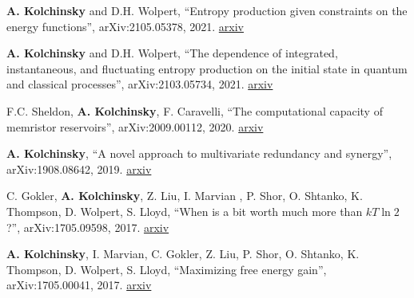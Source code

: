 
\textbf{A. Kolchinsky} and D.H. Wolpert, ``Entropy production given constraints on the energy functions'', arXiv:2105.05378, 2021. \href{http://arxiv.org/abs/2105.05378}{arxiv}


\textbf{A. Kolchinsky} and D.H. Wolpert, ``The dependence of integrated, instantaneous, and fluctuating entropy production on the initial state in quantum and classical processes'', arXiv:2103.05734, 2021. \href{http://arxiv.org/abs/2103.05734}{arxiv}


F.C. Sheldon, \textbf{A. Kolchinsky}, F. Caravelli, ``The computational capacity of memristor reservoirs'', arXiv:2009.00112, 2020. \href{http://arxiv.org/abs/2009.00112}{arxiv}


\textbf{A. Kolchinsky}, ``A novel approach to multivariate redundancy and synergy'', arXiv:1908.08642, 2019. \href{https://arxiv.org/abs/1908.08642}{arxiv}

C. Gokler, \textbf{A. Kolchinsky}, Z. Liu, I. Marvian , P. Shor, O. Shtanko, K. Thompson, D. Wolpert, S. Lloyd, ``When is a bit worth much more than $kT \ln 2$?'', arXiv:1705.09598, 2017. \href{https://arxiv.org/abs/1705.09598}{arxiv}

\textbf{A. Kolchinsky}, I. Marvian, C. Gokler, Z. Liu, P. Shor, O. Shtanko, K. Thompson, D. Wolpert, S. Lloyd, ``Maximizing free energy gain'', arXiv:1705.00041, 2017. \href{https://arxiv.org/abs/1705.00041}{arxiv}

